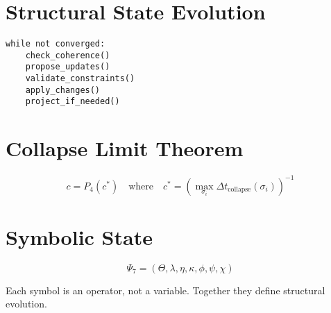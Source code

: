 \section*{Structural State Evolution}

\begin{verbatim}
while not converged:
    check_coherence()
    propose_updates()
    validate_constraints()
    apply_changes()
    project_if_needed()
\end{verbatim}

\section*{Collapse Limit Theorem}
\[
c = P_4(c^*) \quad \text{where} \quad c^* = \left( \max_{\sigma_i} \Delta t_{\text{collapse}}(\sigma_i) \right)^{-1}
\]

\section*{Symbolic State}

\[
\Psi_7 = (\Theta, \lambda, \eta, \kappa, \phi, \psi, \chi)
\]

Each symbol is an operator, not a variable. Together they define structural evolution.

